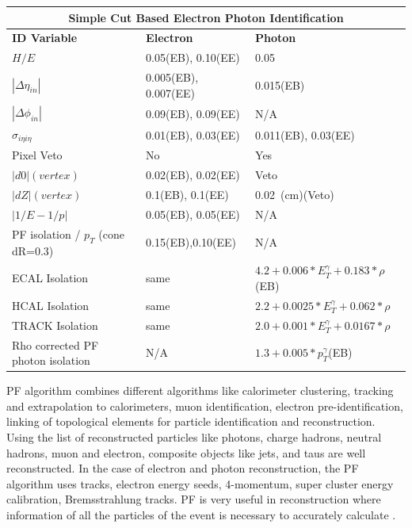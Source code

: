 \begin{center}
\centering
\begin{tabular}{l|l|p{3.2cm}} %
  \multicolumn{3}{c}{\bfseries{Simple Cut Based Electron Photon Identification}} \\
  \toprule
  \hline
  \bfseries{ID Variable} & \bfseries{Electron} & \bfseries{Photon} \\
   \hline
  $H/E$ & 0.05(EB), 0.10(EE)  & 0.05 \\
  \hline
  $|\Delta \eta_{in}|$ & 0.005(EB), 0.007(EE)  & 0.015(EB)  \\
  \hline
   $|\Delta \phi_{in}|$ & 0.09(EB), 0.09(EE)  & N/A \\ \hline
   $\sigma_{i\eta i\eta}$ & 0.01(EB), 0.03(EE) & 0.011(EB), 0.03(EE)  \\
   \hline
   Pixel Veto & No & Yes \\
   \hline
   $|d0|(vertex)$ & 0.02(EB), 0.02(EE) &  Veto \\
   \hline
    $|dZ|(vertex)$ & 0.1(EB), 0.1(EE) & 0.02~(cm)(Veto) \\
    \hline
     $|1/E - 1/p|$ & 0.05(EB), 0.05(EE) & N/A \\
     \hline
     PF isolation / $p_{T}$ (cone dR=0.3) & 0.15(EB),0.10(EE) &  N/A \\
     \hline
     ECAL Isolation & same  & $4.2 + 0.006*E^{\gamma}_{T} + 0.183*\rho$(EB) \\
     \hline
     HCAL Isolation & same & $2.2 + 0.0025*E^{\gamma}_{T} + 0.062*\rho$ \\
     \hline
     TRACK Isolation & same  & $2.0 + 0.001*E^{\gamma}_{T} + 0.0167*\rho$ \\
     \hline
     Rho corrected PF photon isolation & N/A & $1.3 + 0.005*p^{\gamma}_{T}$(EB) \\      
   \hline
   \bottomrule
  \end{tabular}
 \label{tab:EgammaID} %
 \end{center}

PF algorithm combines different algorithms like calorimeter clustering,  tracking and extrapolation to calorimeters, muon identification, electron pre-identification, linking of topological elements for particle identification and reconstruction. Using the list of reconstructed particles like photons, charge hadrons, neutral hadrons, muon and electron, composite objects like jets, \MET and taus are well reconstructed.
In the case of electron and photon reconstruction, the PF algorithm uses tracks, electron energy seeds, 4-momentum, super cluster energy calibration, Bremsstrahlung tracks. PF is very useful in \MET reconstruction where information of all the particles of the event is necessary to accurately calculate \MET.




